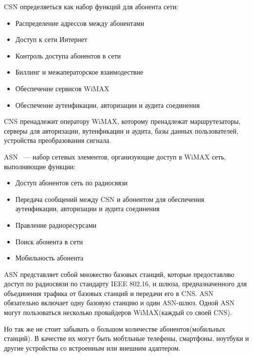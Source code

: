 \documentclass[14pt,a4paper]{article}
\begin{document}
CSN определяеться как набор функций для
абонента сети:
\begin{itemize}
\item{}Распределение адрессов между абонентами
\item{}Доступ к сети Интернет
\item{}Контроль доступа абонентов в сети
\item{}Биллинг и межаператорское взаимодествие
\item{}Обеспечение сервисов WiMAX
\item{}Обеспечение аутенфикации, авторизации и аудита соединения
\end{itemize}

CNS пренадлежит оператору WiMAX, которому пренадлежат маршрутезаторы, серверы
для авторизации, вутенфикации и аудита, базы данных пользователей, устройства
преобразования сигнала.

ASN ~--- набор сетевых элементов, организующие доступ в WiMAX сеть, выполняющие
функции:
\begin{itemize}
\item{}Доступ абонентов сеть по радиосвязи
\item{}Передача сообщений между CSN и абонентом для обеспечения аутенфикации,
авторизации и аудита соединения
\item{}Правление радиоресурсами
\item{}Поиск абонента в сети
\item{}Мобильность абонента
\end{itemize}

ASN представляет собой множество базовых станций, которые предоставляю доступ по
радиосвязи по стандарту IEEE 802.16, и шлюза, предназначенного для объединения
трафика от базовых станций и передачи его в CNS. ASN обязательно включает одну
базовую станцию и один ASN-шлюз. Одной ASN могут пользоваться несколько
провайдеров WiMAX(каждый со своей CNS).

Но так же не стоит забывать о большом количестве абонентов(мобильных станций). В
качестве их могут быть мобтльные телефены, смартфоны, ноутбуки и другие
устройства со встроенным или внешним адаптером.
\newpage
\end{document}
